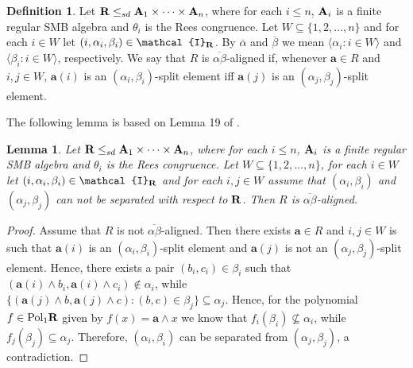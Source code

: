 \documentclass[11pt]{amsart}
\newcommand{\m}[1]{{\uppercase {\mathbf {#1}}}}
\newcommand{\vr}[1]{{\uppercase {\mathcal{#1}}}}
\newcommand{\poln}[2]{{\rm Pol_{#1}\m #2}}
\newcommand{\lb}{\langle}
\newcommand{\rb}{\rangle}
\newcommand{\mt}{\wedge}
\newtheorem{lm}[thm]{Lemma}
\newtheorem{cor}[thm]{Corollary}
\theoremstyle{definition}
\newtheorem{df}[thm]{Definition}
\begin{document}
\begin{df}\label{aligndef}
Let $\m R\leq_{sd}\m a_1\times\dots\times\m a_n$, where for each $i\leq n$, $\m a_i$ is a finite regular SMB algebra and $\theta_i$ is the Rees congruence. Let $W\subseteq\{1,2,\dots,n\}$ and for each $i\in W$ let $(i,\alpha_i,\beta_i)\in\vr i_{\m R}$. By $\overline{\alpha}$ and $\overline{\beta}$ we mean $\lb\alpha_i:i\in W\rb$ and $\lb\beta_i:i\in W\rb$, respectively. We say that $R$ is $\overline{\alpha\beta}$-aligned if, whenever $\mathbf{a}\in R$ and $i,j\in W$, $\mathbf{a}(i)$ is an $(\alpha_i,\beta_i)$-split element iff $\mathbf{a}(j)$ is an $(\alpha_j,\beta_j)$-split element.
\end{df}

The following lemma is based on Lemma 19 of \cite{BuSMB}.

\begin{lm}\label{alignorseparate}
Let $\m R\leq_{sd}\m a_1\times\dots\times\m a_n$, where for each $i\leq n$, $\m a_i$ is a finite regular SMB algebra and $\theta_i$ is the Rees congruence. Let $W\subseteq\{1,2,\dots,n\}$, for each $i\in W$ let $(i,\alpha_i,\beta_i)\in\vr i_{\m R}$ and for each $i,j\in W$ assume that $(\alpha_i,\beta_i)$ and $(\alpha_j,\beta_j)$ can not be separated with respect to $\m r$. Then $R$ is $\overline{\alpha\beta}$-aligned.
\end{lm}

\begin{proof}
Assume that $R$ is not $\overline{\alpha\beta}$-aligned. Then there exists $\mathbf{a}\in R$ and $i,j\in W$ is such that $\mathbf{a}(i)$ is an $(\alpha_i,\beta_i)$-split element and $\mathbf{a}(j)$ is not an $(\alpha_j,\beta_j)$-split element. Hence, there exists a pair $(b_i,c_i)\in\beta_i$ such that $(\mathbf{a}(i)\mt b_i,\mathbf{a}(i)\mt c_i)\notin\alpha_i$, while $\{(\mathbf{a}(j)\mt b,\mathbf{a}(j)\mt c):(b,c)\in\beta_j\}\subseteq \alpha_j$. Hence, for the polynomial $f\in\poln{1}{r}$ given by $f(x)=\mathbf{a}\mt x$ we know that $f_i(\beta_i)\nsubseteq \alpha_i$, while $f_j(\beta_j)\subseteq \alpha_j$. Therefore, $(\alpha_i,\beta_i)$ can be separated from $(\alpha_j,\beta_j)$, a contradiction.
\end{proof}


\end{document}
